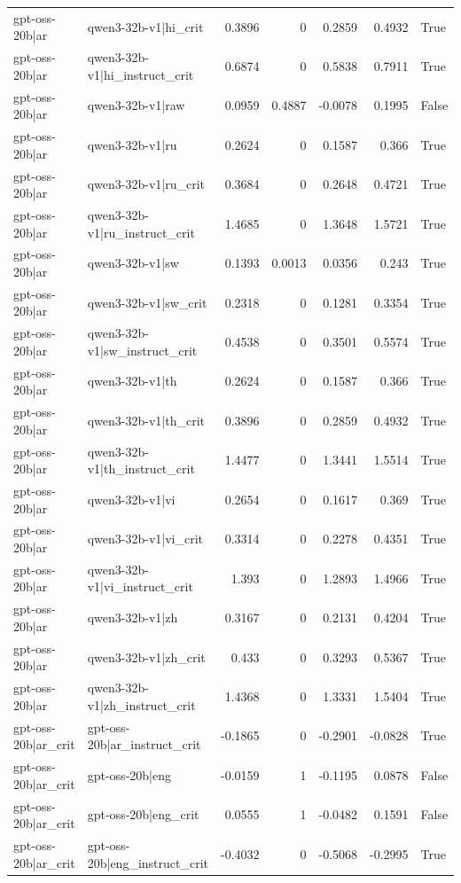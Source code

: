\begin{table}
\begin{tabular}{l l r r r r l}
gpt-oss-20b|ar & qwen3-32b-v1|hi_crit & 0.3896 & 0 & 0.2859 & 0.4932 & True \\
gpt-oss-20b|ar & qwen3-32b-v1|hi_instruct_crit & 0.6874 & 0 & 0.5838 & 0.7911 & True \\
gpt-oss-20b|ar & qwen3-32b-v1|raw & 0.0959 & 0.4887 & -0.0078 & 0.1995 & False \\
gpt-oss-20b|ar & qwen3-32b-v1|ru & 0.2624 & 0 & 0.1587 & 0.366 & True \\
gpt-oss-20b|ar & qwen3-32b-v1|ru_crit & 0.3684 & 0 & 0.2648 & 0.4721 & True \\
gpt-oss-20b|ar & qwen3-32b-v1|ru_instruct_crit & 1.4685 & 0 & 1.3648 & 1.5721 & True \\
gpt-oss-20b|ar & qwen3-32b-v1|sw & 0.1393 & 0.0013 & 0.0356 & 0.243 & True \\
gpt-oss-20b|ar & qwen3-32b-v1|sw_crit & 0.2318 & 0 & 0.1281 & 0.3354 & True \\
gpt-oss-20b|ar & qwen3-32b-v1|sw_instruct_crit & 0.4538 & 0 & 0.3501 & 0.5574 & True \\
gpt-oss-20b|ar & qwen3-32b-v1|th & 0.2624 & 0 & 0.1587 & 0.366 & True \\
gpt-oss-20b|ar & qwen3-32b-v1|th_crit & 0.3896 & 0 & 0.2859 & 0.4932 & True \\
gpt-oss-20b|ar & qwen3-32b-v1|th_instruct_crit & 1.4477 & 0 & 1.3441 & 1.5514 & True \\
gpt-oss-20b|ar & qwen3-32b-v1|vi & 0.2654 & 0 & 0.1617 & 0.369 & True \\
gpt-oss-20b|ar & qwen3-32b-v1|vi_crit & 0.3314 & 0 & 0.2278 & 0.4351 & True \\
gpt-oss-20b|ar & qwen3-32b-v1|vi_instruct_crit & 1.393 & 0 & 1.2893 & 1.4966 & True \\
gpt-oss-20b|ar & qwen3-32b-v1|zh & 0.3167 & 0 & 0.2131 & 0.4204 & True \\
gpt-oss-20b|ar & qwen3-32b-v1|zh_crit & 0.433 & 0 & 0.3293 & 0.5367 & True \\
gpt-oss-20b|ar & qwen3-32b-v1|zh_instruct_crit & 1.4368 & 0 & 1.3331 & 1.5404 & True \\
gpt-oss-20b|ar_crit & gpt-oss-20b|ar_instruct_crit & -0.1865 & 0 & -0.2901 & -0.0828 & True \\
gpt-oss-20b|ar_crit & gpt-oss-20b|eng & -0.0159 & 1 & -0.1195 & 0.0878 & False \\
gpt-oss-20b|ar_crit & gpt-oss-20b|eng_crit & 0.0555 & 1 & -0.0482 & 0.1591 & False \\
gpt-oss-20b|ar_crit & gpt-oss-20b|eng_instruct_crit & -0.4032 & 0 & -0.5068 & -0.2995 & True \\

\end{tabular}
\end{table}
